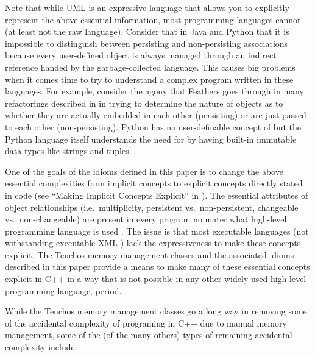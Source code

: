 \documentclass[pdf,ps2pdf,11pt]{SANDreport}
\begin{document}
Note that while UML is an expressive language that allows you to
explicitly represent the above essential information, most programming
languages cannot (at least not the raw language).  Consider that in
Java and Python that it is impossible to distinguish between
persisting and non-persisting associations because every user-defined
object is always managed through an indirect reference handed by the
garbage-collected language.  This causes big problems when it comes
time to try to understand a complex program written in these
languages.  For example, consider the agony that Feathers goes through
in many refactorings described in
{}\cite{WorkingEffectivelyWithLegacyCode05} in trying to determine the
nature of objects as to whether they are actually embedded in each
other (persisting) or are just passed to each other (non-persisting).
Python has no user-definable concept of {} but the
Python language itself understands the need for {} by
having built-in immutable data-types like strings and tuples.

One of the goals of the idioms defined in this paper is to change the
above essential complexities from implicit concepts to explicit
concepts directly stated in code (see ``Making Implicit Concepts
Explicit'' in {}\cite[Chapter 9]{DomainDrivenDesign}).  The essential
attributes of object relationships (i.e.\ multiplicity, persistent
vs.\ non-persistent, changeable vs.\ non-changeable) are present in
every program no mater what high-level programming language is used
{}\cite{MythicalManMonth95, CodeComplete2nd04,
WorkingEffectivelyWithLegacyCode05}.  The issue is that most
executable languages (not withstanding executable XML {}\cite[Chapter
1]{UMLDistilledThirdEdition04}) lack the expressiveness to make these
concepts explicit.  The Teuchos memory management classes and the
associated idioms described in this paper provide a means to make many
of these essential concepts explicit in C++ in a way that is not
possible in any other widely used high-level programming language,
period.  

While the Teuchos memory management classes go a long way in
removing some of the accidental complexity of programing in C++ due to
manual memory management, some of the (of the many others) types of
remaining accidental complexity include:
\end{document}
